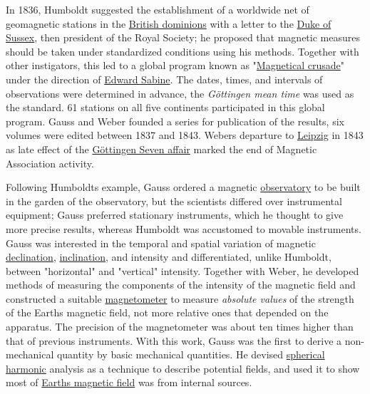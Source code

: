 In 1836, Humboldt suggested the establishment of a worldwide net of geomagnetic stations in the \href{https://en.wikipedia.org/wiki/British_Empire}{British dominions} with a letter to the \href{https://en.wikipedia.org/wiki/Prince_Augustus_Frederick,_Duke_of_Sussex}{Duke of Sussex}, then president of the Royal Society; he proposed that magnetic measures should be taken under standardized conditions using his methods. Together with other instigators, this led to a global program known as "\href{https://en.wikipedia.org/wiki/Edward_Sabine\#Magnetical_crusade}{Magnetical crusade}" under the direction of \href{https://en.wikipedia.org/wiki/Edward_Sabine}{Edward Sabine}. The dates, times, and intervals of observations were determined in advance, the \emph{Göttingen mean time} was used as the standard. 61 stations on all five continents participated in this global program. Gauss and Weber founded a series for publication of the results, six volumes were edited between 1837 and 1843. Weber\textquotesingle s departure to \href{https://en.wikipedia.org/wiki/Leipzig_University}{Leipzig} in 1843 as late effect of the \href{https://en.wikipedia.org/wiki/Göttingen_Seven}{Göttingen Seven affair} marked the end of Magnetic Association activity.

Following Humboldt\textquotesingle s example, Gauss ordered a magnetic \href{https://en.wikipedia.org/wiki/Observatory}{observatory} to be built in the garden of the observatory, but the scientists differed over instrumental equipment; Gauss preferred stationary instruments, which he thought to give more precise results, whereas Humboldt was accustomed to movable instruments. Gauss was interested in the temporal and spatial variation of magnetic \href{https://en.wikipedia.org/wiki/Magnetic_declination}{declination}, \href{https://en.wikipedia.org/wiki/Magnetic_dip}{inclination}, and intensity and differentiated, unlike Humboldt, between "horizontal" and "vertical" intensity. Together with Weber, he developed methods of measuring the components of the intensity of the magnetic field and constructed a suitable \href{https://en.wikipedia.org/wiki/Magnetometer}{magnetometer} to measure \emph{absolute values} of the strength of the Earth\textquotesingle s magnetic field, not more relative ones that depended on the apparatus. The precision of the magnetometer was about ten times higher than that of previous instruments. With this work, Gauss was the first to derive a non-mechanical quantity by basic mechanical quantities. He devised \href{https://en.wikipedia.org/wiki/Spherical_harmonics}{spherical harmonic} analysis as a technique to describe potential fields, and used it to show most of \href{https://en.wikipedia.org/wiki/Earth's_magnetic_field}{Earth\textquotesingle s magnetic field} was from internal sources.

